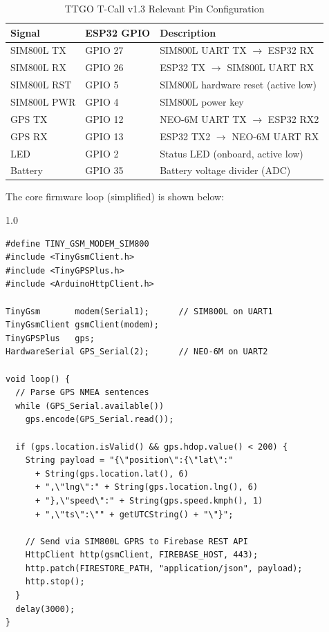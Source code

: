 \documentclass[12pt,a4paper]{report}
\begin{document}
\begin{table}[t]
\caption{TTGO T-Call v1.3 Relevant Pin Configuration}
\label{tab:pins}
\centering
\begin{tabular}{lll}
\toprule
\textbf{Signal} & \textbf{ESP32 GPIO} & \textbf{Description}\\
\midrule
SIM800L TX & GPIO 27 & SIM800L UART TX $\to$ ESP32 RX \\
SIM800L RX & GPIO 26 & ESP32 TX $\to$ SIM800L UART RX \\
SIM800L RST & GPIO 5 & SIM800L hardware reset (active low) \\
SIM800L PWR & GPIO 4 & SIM800L power key \\
GPS TX     & GPIO 12 & NEO-6M UART TX $\to$ ESP32 RX2 \\
GPS RX     & GPIO 13 & ESP32 TX2 $\to$ NEO-6M UART RX \\
LED        & GPIO 2  & Status LED (onboard, active low) \\
Battery    & GPIO 35 & Battery voltage divider (ADC) \\
\bottomrule
\end{tabular}
\end{table}

The core firmware loop (simplified) is shown below:

\begin{spacing}{1.0}
\small
\begin{verbatim}
#define TINY_GSM_MODEM_SIM800
#include <TinyGsmClient.h>
#include <TinyGPSPlus.h>
#include <ArduinoHttpClient.h>

TinyGsm       modem(Serial1);      // SIM800L on UART1
TinyGsmClient gsmClient(modem);
TinyGPSPlus   gps;
HardwareSerial GPS_Serial(2);      // NEO-6M on UART2

void loop() {
  // Parse GPS NMEA sentences
  while (GPS_Serial.available())
    gps.encode(GPS_Serial.read());

  if (gps.location.isValid() && gps.hdop.value() < 200) {
    String payload = "{\"position\":{\"lat\":"
      + String(gps.location.lat(), 6)
      + ",\"lng\":" + String(gps.location.lng(), 6)
      + "},\"speed\":" + String(gps.speed.kmph(), 1)
      + ",\"ts\":\"" + getUTCString() + "\"}";

    // Send via SIM800L GPRS to Firebase REST API
    HttpClient http(gsmClient, FIREBASE_HOST, 443);
    http.patch(FIRESTORE_PATH, "application/json", payload);
    http.stop();
  }
  delay(3000);
}
\end{verbatim}
\end{spacing}
\end{document}
